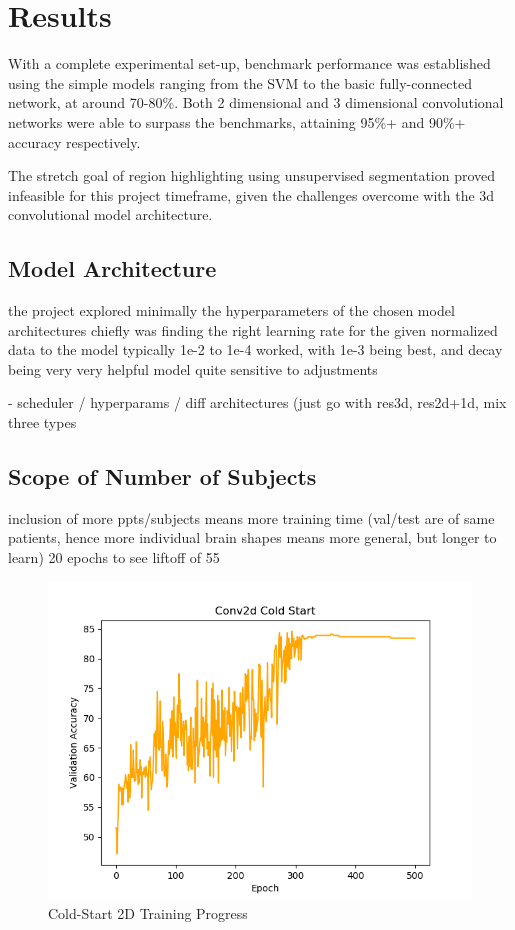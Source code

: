 \section{Results}\label{sec:results}

With a complete experimental set-up, benchmark performance was established using the simple models ranging from the
SVM to the basic fully-connected network, at around 70-80\%.
Both 2 dimensional and 3 dimensional convolutional networks were able to surpass the benchmarks,
attaining 95\%+ and 90\%+ accuracy respectively.

The stretch goal of region highlighting using unsupervised segmentation proved infeasible for this project timeframe, given
the challenges overcome with the 3d convolutional model architecture.

\subsection{Model Architecture}\label{subsec:model-arch}

the project explored minimally the hyperparameters of the chosen model architectures
chiefly was finding the right learning rate for the given normalized data to the model
typically 1e-2 to 1e-4 worked, with 1e-3 being best, and decay being very very helpful
model quite sensitive to adjustments

- scheduler / hyperparams / diff architectures (just go with res3d, res2d+1d, mix three types

\subsection{Scope of Number of Subjects}\label{subsec:num-subjects}

inclusion of more ppts/subjects means more training time (val/test are of same patients,
hence more individual brain shapes means more general, but longer to learn)
20 epochs to see liftoff of 55%

 \begin{figure}
  \includegraphics[width=\linewidth]{images/2d_cold.png}
  \caption{Cold-Start 2D Training Progress}
  \label{fig:2d_cold}
\end{figure}

